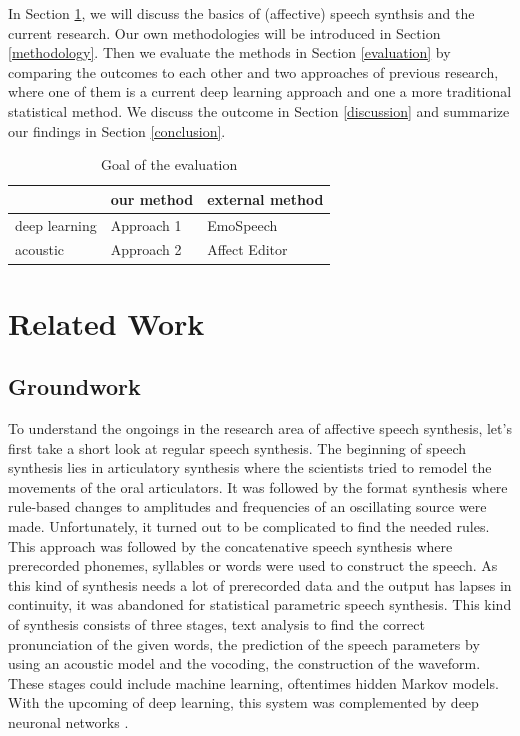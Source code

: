 \documentclass[11pt]{article}
\begin{document}
In Section \ref{related_work}, we will discuss the basics of (affective) speech synthsis and the current research. Our own methodologies will be introduced in Section \ref{methodology}. Then we evaluate the methods in  Section \ref{evaluation} by comparing the outcomes to each other and two approaches of previous research, where one of them is a current deep learning approach and one a more traditional statistical method. We discuss the outcome in Section \ref{discussion} and summarize our findings in Section \ref{conclusion}.

\begin{table}[h]

\vspace{5px}
{
\begin{tabular}{|l|l|l|}
\hline
\rowcolor{gainsboro}&our method&external method\\
\hline
\cellcolor{gainsboro}deep learning&Approach 1&EmoSpeech\\
\hline
\cellcolor{gainsboro}acoustic&Approach 2&Affect Editor\\
\hline

\end{tabular}

}
\caption{Goal of the evaluation}
\end{table}


\section{Related Work}
\label{related_work}
\subsection{Groundwork}
To understand the ongoings in the research area of affective speech synthesis, let’s first take a short look at regular speech synthesis. The beginning of speech synthesis lies in articulatory synthesis where the scientists tried to remodel the movements of the oral articulators. It was followed by the format synthesis where rule-based changes to amplitudes and frequencies of an oscillating source were made. Unfortunately, it turned out to be complicated to find the needed rules. This approach was followed by the concatenative speech synthesis where prerecorded phonemes, syllables or words were used to construct the speech. As this kind of synthesis needs a lot of prerecorded data and the output has lapses in continuity, it was abandoned for statistical parametric speech synthesis. This kind of synthesis consists of three stages, text analysis to find the correct pronunciation of the given words, the prediction of the speech parameters by using an acoustic model and the vocoding, the construction of the waveform. These stages could include machine learning, oftentimes hidden Markov models. With the upcoming of deep learning, this system was complemented by deep neuronal networks \cite{triantafyllopoulos_overview_2023,shen_natural_2018}.
\end{document}

